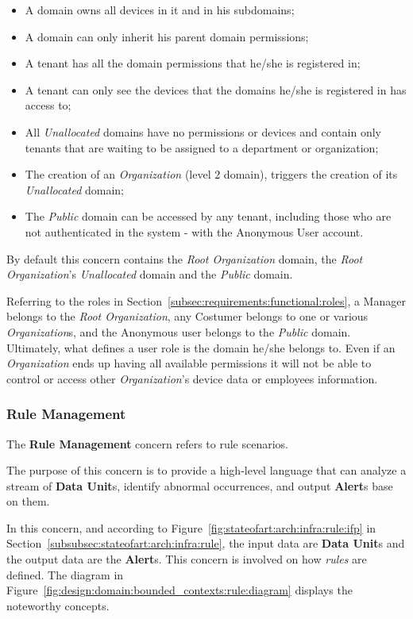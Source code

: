 \begin{itemize}
   \item A domain owns all devices in it and in his subdomains;
   \item A domain can only inherit his parent domain permissions;
   \item A tenant has all the domain permissions that he/she is registered in;
   \item A tenant can only see the devices that the domains he/she is registered in has access to;
   \item All \textit{Unallocated} domains have no permissions or devices and contain only tenants that are waiting to be assigned to a department or organization;
   \item The creation of an \textit{Organization} (level 2 domain), triggers the creation of its \textit{Unallocated} domain;
   \item The \textit{Public} domain can be accessed by any tenant, including those who are not authenticated in the system - with the Anonymous User account.
\end{itemize}

By default this concern contains the \textit{Root Organization} domain, the \textit{Root Organization}'s  \textit{Unallocated} domain and the \textit{Public} domain.

Referring to the roles in Section~\ref{subsec:requirements:functional:roles}, a Manager belongs to the \textit{Root Organization}, any Costumer belongs to one or various \textit{Organization}s, and the Anonymous user belongs to the \textit{Public} domain.
Ultimately, what defines a user role is the domain he/she belongs to. Even if an \textit{Organization} ends up having all available permissions it will not be able to control or access other \textit{Organization}'s device data or employees information.

\subsubsection{Rule Management}
\label{subsubsec:design:domain:bounded_contexts:rule}

The \textbf{Rule Management} concern refers to rule scenarios.

The purpose of this concern is to provide a high-level language that can analyze a stream of \textbf{Data Unit}s, identify abnormal occurrences, and output \textbf{Alert}s base on them.

In this concern, and according to Figure~\ref{fig:stateofart:arch:infra:rule:ifp} in Section~\ref{subsubsec:stateofart:arch:infra:rule}, the input data are \textbf{Data Unit}s and the output data are the \textbf{Alert}s. This concern is involved on how \textit{rules} are defined. The diagram in Figure~\ref{fig:design:domain:bounded_contexts:rule:diagram} displays the noteworthy concepts.

